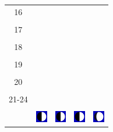 \documentclass[twoside, a4paper,12pt, tikz]{scrartcl}
\begin{document}
\begin{tabularx}{\linewidth}{|c|X|X|p{2cm}|p{2cm}|}
            &   &       &    &   \\
          \hline
          16&   &                 &    &   \\
            &   &       &    &   \\
          \hline
          17&   &                 &    &   \\
            &   &       &    &   \\
          \hline
          18&   &                 &    &   \\
            &   &       &    &   \\
          \hline
          19&   &                 &     &   \\
            &   &       &    &   \\
          \hline
          20&   &              &    &   \\
            &   &       &    &   \\
          \hline 
          21-24&   &              &    &   \\
            &   &       &    &   \\
          \hline
                      & \vspace{0.01cm} \centerline{\includegraphics[width=0.5cm]{moon_phases/Moon_phase_2.svg.png}} \vspace{0.1cm} & \vspace{0.01cm} \centerline{\includegraphics[width=0.5cm]{moon_phases/Moon_phase_2.svg.png}} \vspace{0.1cm} & \vspace{0.01cm} \centerline{\includegraphics[width=0.5cm]{moon_phases/Moon_phase_2.svg.png}} \vspace{0.1cm} & \vspace{0.01cm} \centerline{\includegraphics[width=0.5cm]{moon_phases/Moon_phase_3.svg.png}} \vspace{0.1cm}\\
          \hline    
        \end{tabularx}
\end{document}
